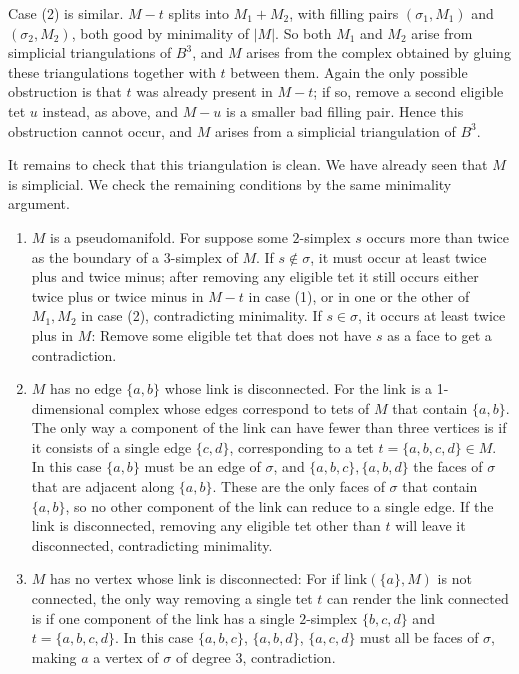 \documentclass[12pt]{article}
\newcommand{\kw}{\mathrm}
\newcommand{\link}{\kw{link}}
\begin{document}
Case (2) is similar.
$M-t$ splits into $M_1+M_2$, with filling pairs $(\sigma_1,M_1)$ and
$(\sigma_2,M_2)$, both good by minimality of $|M|$.
So both $M_1$ and $M_2$ arise from simplicial triangulations of $B^3$,
and $M$ arises from the complex obtained by gluing these triangulations
together with $t$ between them.
Again the only possible obstruction is that $t$ was already present in
$M-t$; if so, remove a second eligible tet $u$ instead, as above, and
$M-u$ is a smaller bad filling pair.  Hence this obstruction cannot occur,
and $M$ arises from a simplicial triangulation of $B^3$.

It remains to check that this triangulation is clean.  We have already seen
that $M$ is simplicial.  We check the remaining conditions by the same
minimality argument.

\begin{enumerate}

\item
$M$ is a pseudomanifold.
For suppose some $2$-simplex $s$ occurs more than twice as the boundary
of a $3$-simplex of $M$.
If $s \notin \sigma$,
it must occur at least twice plus and twice minus;
after removing any eligible tet it
still occurs either twice plus or twice minus in $M-t$ in case (1),
or in one or the other of $M_1,M_2$ in case (2),
contradicting minimality.
If $s \in \sigma$,
it occurs at least twice plus in $M$:
Remove some eligible tet that does not have $s$ as a face
to get a contradiction.

\item
$M$ has no edge $\{a,b\}$ whose link
is disconnected.
For the link is a 1-dimensional complex whose edges correspond to
tets of $M$ that contain $\{a,b\}$.
The only way a component of the link can have fewer than three
vertices is if it consists of a single edge $\{c,d\}$, corresponding
to a tet $t=\{a,b,c,d\} \in M$.
In this case $\{a,b\}$ must be an edge of $\sigma$,
and $\{a,b,c\},\{a,b,d\}$ the faces of $\sigma$
that are adjacent along $\{a,b\}$.
These are the only faces of $\sigma$ that contain $\{a,b\}$,
so no other component of the link can reduce to a single edge.
If the link is disconnected, removing any eligible tet
other than $t$ will
leave it disconnected, contradicting minimality.

\item
$M$ has no vertex whose link is disconnected:
For if $\link(\{a\},M)$ is not connected,
the only way removing a single tet $t$
can render the link connected
is if one component of the link has a single $2$-simplex
$\{b,c,d\}$ and $t=\{a,b,c,d\}$.
In this case $\{a,b,c\}$, $\{a,b,d\}$, $\{a,c,d\}$ must
all be faces of $\sigma$,
making $a$ a vertex of $\sigma$ of degree $3$, contradiction.

\end{enumerate}
\end{document}
